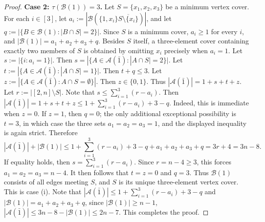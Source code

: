 \documentclass[10pt,a4paper]{amsart}
\newcommand{\m}{\mathcal}
\begin{document}
\begin{proof}
{\bf Case 2: $\tau(\m B(1))=3$.}
Let $S=\{x_1,x_2,x_3\}$ 
be a minimum vertex cover. 
For each $i\in[3]$, let $a_i:=|\m B(\{1,x_i\}\overline{S\setminus \{x_i\}})|$, and let $q:=|\{B\in \m B(1): |B\cap S|=2\}|$.
Since $S$ is a minimum cover, $a_i\ge1$ for every $i$, and $|\m B(1)|=a_1+a_2+a_3+q.$
Besides $S$ itself, a three-element cover containing exactly two members of $S$ is obtained by omitting $x_i$ precisely when $a_i=1$. Let $s:=|\{i:a_i=1\}|$. Then $s=|\{A\in \m A(\bar1): |A\cap S|=2\}|$.
Let $t:=|\{A\in \m A(\bar1): |A\cap S|=1\}|$.
Then $t+q\le 3$.
Let $z:=|\{A\in \m A(\bar1): A\cap S=\emptyset\}|$. Then $z\in\{0,1\}$.
Thus $|\m A(\bar1)|=1+s+t+z$.
Let $r:=|[2,n]\setminus S|$. Note that $s\le\sum_{i=1}^3(r-a_i).$ 
Then $|\m A(\bar1)|=1+s+t+z \le 1+ \sum_{i=1}^3(r-a_i)+3-q.$
Indeed, this is immediate when $z=0$. If $z=1$, then $q=0$; the only additional exceptional possibility is $t=3$, in which case the three sets $a_1=a_2=a_3=1$, and the displayed inequality is again strict.
Therefore 
\[
|\m A(\bar1)|+|\m B(1)|\le 1+ \sum_{i=1}^3(r-a_i)+3-q+a_1+a_2+a_3+q=3r+4=3n-8.
\]
If equality holds, then $s=\sum_{i=1}^3(r-a_i).$ 
Since $r=n-4\ge3$, this forces $a_1=a_2=a_3=n-4.$
It then follows that $t=z=0$ and $q=3$. Thus $\m B(1)$ consists of all
edges meeting $S$, and $S$ is its unique three-element vertex cover.
This is case \rm(i).
Note that $|\m A(\bar1)|\le 1+ \sum_{i=1}^3(r-a_i)+3-q$ and $|\m B(1)|=a_1+a_2+a_3+q$, since $|\m B(1)|\ge n-1$, $|\m A(\bar1)|\le 3n-8-|\m B(1)|\le 2n-7$.
This completes the proof.
\end{proof}
\end{document}
